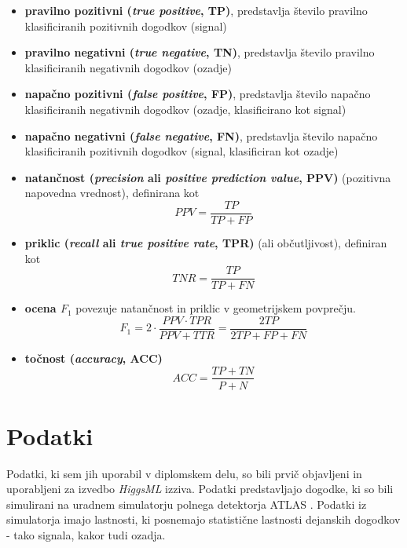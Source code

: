 \documentclass[11pt,a4paper,openany]{book}
\begin{document}
\begin{itemize}
	\item \textbf{pravilno pozitivni (\textit{true positive}, TP)}, predstavlja število pravilno klasificiranih pozitivnih dogodkov (signal)
	\item \textbf{pravilno negativni (\textit{true negative}, TN)}, predstavlja število pravilno klasificiranih negativnih dogodkov (ozadje)
	\item \textbf{napačno pozitivni (\textit{false positive}, FP)}, predstavlja število napačno klasificiranih negativnih dogodkov (ozadje, klasificirano kot signal)
	\item \textbf{napačno negativni (\textit{false negative}, FN)}, predstavlja število napačno klasificiranih pozitivnih dogodkov (signal, klasificiran kot ozadje)
	\item \textbf{natančnost (\textit{precision} ali \textit{positive prediction value}, PPV)} (pozitivna napovedna vrednost), definirana kot 
	\begin{equation}	
	PPV = \frac{TP}{TP + FP}
	\end{equation}
	\item \textbf{priklic (\textit{recall} ali \textit{true positive rate}, TPR)} (ali občutljivost), definiran kot
	\begin{equation}	
	TNR = \frac{TP}{TP + FN}
	\end{equation}
	\item \textbf{ocena $F_1$} povezuje natančnost in priklic v geometrijskem povprečju. 
	\begin{equation}
	F_1 = 2 \cdot \frac{PPV \cdot TPR}{PPV + TTR} = \frac{2TP}{2TP + FP + FN}
	\end{equation}
	\item \textbf{točnost (\textit{accuracy}, ACC)}
	\begin{equation}
	ACC = \frac{TP + TN}{P + N}
	\end{equation}
\end{itemize}

\chapter{Podatki}
\label{analiza-podatkov}
Podatki, ki sem jih uporabil v diplomskem delu, so bili prvič objavljeni in uporabljeni za izvedbo \textit{HiggsML} izziva. Podatki predstavljajo dogodke, ki so bili simulirani na uradnem simulatorju polnega detektorja ATLAS \cite{Adam-Bourdarios14}. Podatki iz simulatorja imajo lastnosti, ki posnemajo statistične lastnosti dejanskih dogodkov - tako signala, kakor tudi ozadja.
\end{document}
